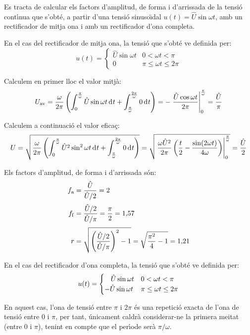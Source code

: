 \begin{exemple}
Es tracta de calcular els factors d'amplitud, de forma i d'arrissada
de la tensi\'{o} cont\'{\i}nua que s'obt\'{e}, a partir d'una tensi\'{o} sinuso\"{\i}dal
$u(t) = \hat{U} \sin\omega t$, amb un rectificador de mitja ona i
amb un rectificador d'ona completa.

En el cas del rectificador de mitja ona, la tensi\'{o} que s'obt\'{e} ve
definida per:
\[
u(t) = \begin{cases} \hat{U} \sin\omega t & 0 < \omega t < \pi\\
       0 & \pi \leq \omega t \leq 2\pi \end{cases}
\]

Calculem en primer lloc el valor mitj\`{a}:
\[
U\ped{av} = \frac{\omega}{2\pi} \left( \int_0^\frac{\pi}{\omega}
\hat{U} \sin\omega t \diff t +
\int_\frac{\pi}{\omega}^\frac{2\pi}{\omega} 0 \diff t \right) = -
\left. \frac{\hat{U} \cos\omega t}{2\pi}
\right|_0^\frac{\pi}{\omega} = \frac{\hat{U}}{\pi}
\]

Calculem a continuaci\'{o} el valor efica\c{c}:
\[
U = \sqrt{\frac{\omega}{2\pi} \left( \int_0^\frac{\pi}{\omega}
\hat{U}^2 \sin^2\omega t \diff t +
\int_\frac{\pi}{\omega}^\frac{2\pi}{\omega} 0 \diff t \right)} =
  \sqrt{\left.\frac{\omega \hat{U}^2}{2\pi}\left( \frac{t}{2} -
\frac{\sin (2\omega t)}{4\omega}
\right)\right|_0^\frac{\pi}{\omega}} = \frac{\hat{U}}{2}
\]

Els factors d'amplitud, de forma i d'arrissada s\'{o}n:
\begin{align*}
    f_\mathrm{a} &= \frac{\hat{U}}{\hat{U}/2} = 2 \\[0.5ex]
    f_\mathrm{f} &= \frac{\hat{U}/2}{\hat{U}/\pi} =\frac{\pi}{2} =
    1{,}57 \\[0.5ex]
    r &= \sqrt{\left(\frac{\hat{U}/2}{\hat{U}/\pi}\right)^2-1} =
\sqrt{\frac{\pi^2}{4}-1} = 1{,}21
\end{align*}


En el cas del rectificador d'ona completa, la tensi\'{o} que s'obt\'{e} ve
definida per:
\[
u(t) = \begin{cases} \rule{3.2mm}{0pt}\hat{U} \sin\omega t & 0 < \omega t < \pi\\
       -\hat{U} \sin\omega t & \pi \leq \omega t \leq 2\pi \end{cases}
\]

En aquest cas, l'ona de tensi\'{o} entre $\pi$ i $2\pi$ \'{e}s una repetici\'{o}
exacta de l'ona de tensi\'{o} entre 0 i $\pi$, per tant, \'{u}nicament
caldr\`{a} considerar-ne la primera meitat (entre 0 i $\pi$), tenint en
compte que el per\'{\i}ode ser\`{a} $\pi/\omega$.


\end{exemple}
